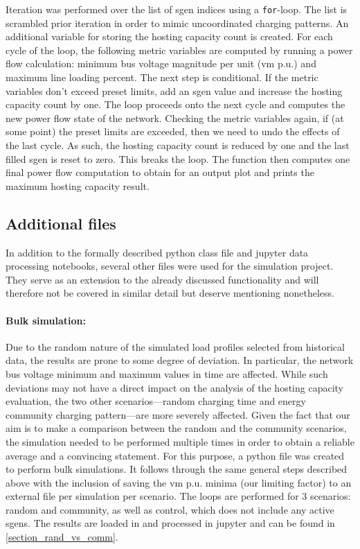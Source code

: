 \documentclass[a4paper,10pt]{report}
\begin{document}
Iteration was performed over the list of sgen indices using a \texttt{for}-loop. The list is scrambled prior iteration in order to mimic uncoordinated charging patterns. An additional variable for storing the hosting capacity count is created. For each cycle of the loop, the following metric variables are computed by running a power flow calculation: minimum bus voltage magnitude per unit (vm p.u.) and maximum line loading percent. The next step is conditional. If the metric variables don't exceed preset limits, add an sgen value and increase the hosting capacity count by one. The loop proceeds onto the next cycle and computes the new power flow state of the network. Checking the metric variables again, if (at some point) the preset limits are exceeded, then we need to undo the effects of the last cycle. As such, the hosting capacity count is reduced by one and the last filled sgen is reset to zero. This breaks the loop. The function then computes one final power flow computation to obtain for an output plot and prints the maximum hosting capacity result.

\newpage
\subsection{Additional files}\label{subsection_additional}
In addition to the formally described python class file and jupyter data processing notebooks, several other files were used for the simulation project. They serve as an extension to the already discussed functionality and will therefore not be covered in similar detail but deserve mentioning nonetheless.

\paragraph{Bulk simulation:} Due to the random nature of the simulated load profiles selected from historical data, the results are prone to some degree of deviation. In particular, the network bus voltage minimum and maximum values in time are affected. While such deviations may not have a direct impact on the analysis of the hosting capacity evaluation, the two other scenarios---random charging time and energy community charging pattern---are more severely affected. Given the fact that our aim is to make a comparison between the random and the community scenarios, the simulation needed to be performed multiple times in order to obtain a reliable average and a convincing statement. For this purpose, a python file was created to perform bulk simulations. It follows through the same general steps described above with the inclusion of saving the vm p.u. minima (our limiting factor) to an external file per simulation per scenario. The loops are performed for 3 scenarios: random and community, as well as control, which does not include any active sgens. The results are loaded in and processed in jupyter and can be found in \cref{section_rand_vs_comm}.
\end{document}
